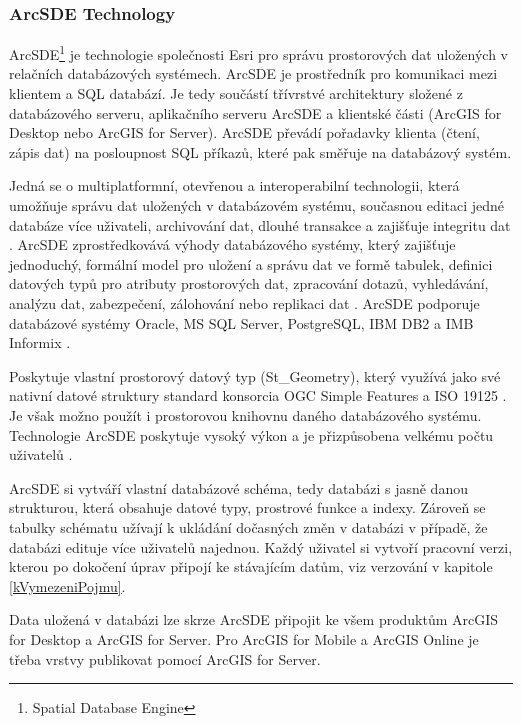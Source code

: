 \subsubsection{ArcSDE Technology}
\label{kArcSDE}

ArcSDE\footnote{Spatial Database Engine} je technologie společnosti Esri pro
správu prostorových dat uložených v relačních databázových systémech. ArcSDE je
prostředník pro komunikaci mezi klientem a SQL databází. Je tedy součástí
třívrstvé architektury složené z databázového serveru, aplikačního serveru ArcSDE
a klientské části (ArcGIS for Desktop nebo Arc\-GIS for Server). ArcSDE převádí pořadavky klienta (čtení, zápis dat)
na posloupnost SQL příkazů, které pak směřuje na databázový systém. 

Jedná se o multiplatformní, otevřenou a interoperabilní technologii, která
umožňuje správu dat uložených v databázovém systému, současnou editaci jedné
databáze více uživateli, archivování dat, dlouhé transakce a zajišťuje
integritu dat \citep{Law2008}. ArcSDE zprostředkovává výhody databázového
systémy, který zajišťuje jednoduchý, formální model pro uložení a správu dat ve
formě tabulek, definici datových typů pro atributy prostorových dat, zpracování
dotazů, vyhledávání, analýzu dat, zabezpečení, zálohování nebo replikaci dat
\citep{Law2008}. ArcSDE podporuje databázové systémy Oracle, MS SQL Server,
PostgreSQL, IBM DB2 a IMB Informix \citep{Esri2013a}.


Poskytuje vlastní prostorový datový typ (St\_Geometry), který využívá jako své
nativní datové struktury standard konsorcia OGC Simple Features a ISO 19125
\citep{Law2008}. Je však možno použít i prostorovou knihovnu daného
databázového systému. Technologie ArcSDE poskytuje vysoký výkon a je přizpůsobena velkému počtu
uživatelů \citep{Esri2006}.

ArcSDE si vytváří vlastní databázové schéma, tedy databázi s jasně danou
strukturou, která obsahuje datové typy, prostrové funkce a indexy. Zároveň se
tabulky schématu užívají k ukládání dočasných změn v databázi v případě, že
databázi e\-di\-tu\-je více uživatelů najednou. Každý uživatel si vytvoří pracovní
verzi, kterou po dokočení úprav připojí ke stávajícím datům, viz verzování v
kapitole \ref{kVymezeniPojmu}.

Data uložená v databázi lze skrze ArcSDE připojit ke všem produktům ArcGIS for Desktop a ArcGIS for Server. Pro ArcGIS
for Mobile a ArcGIS Online je třeba vrstvy publikovat pomocí ArcGIS for Server. 

